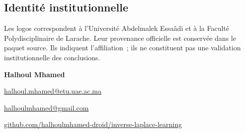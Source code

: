 \documentclass[11pt,a4paper]{article}
\newcommand{\repo}{https://github.com/halhoulmhamed-droid/inverse-laplace-learning}
\begin{document}
\subsection*{Identité institutionnelle}
Les logos correspondent à l'Université Abdelmalek Essaâdi et à la Faculté Polydisciplinaire
de Larache. Leur provenance officielle est conservée dans le paquet source. Ils indiquent
l'affiliation~; ils ne constituent pas une validation institutionnelle des conclusions.

\vspace{.15cm}
\begin{keybox}[Contact]
\textbf{Halhoul Mhamed}\par
\href{mailto:halhoul.mhamed@etu.uae.ac.ma}{halhoul.mhamed@etu.uae.ac.ma}\par
\href{mailto:halhoulmhamed@gmail.com}{halhoulmhamed@gmail.com}\par
\href{\repo}{github.com/halhoulmhamed-droid/inverse-laplace-learning}
\end{keybox}
\end{document}
